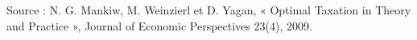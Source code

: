 Source : N. G. Mankiw, M. Weinzierl et D. Yagan, « Optimal Taxation in Theory and Practice », Journal of Economic Perspectives 23(4), 2009.
